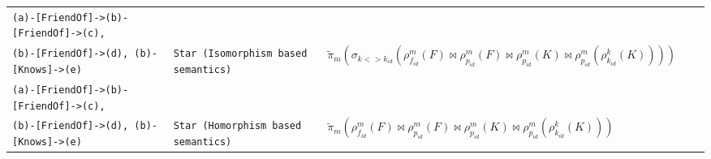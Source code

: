 \documentclass{beamer}
\newcommand{\filt}[2][\mathfrak f]{{\sigma_{#1}\left(#2\right)}}
\newcommand{\rename}[3]{\rho_{#1}^{#2}\left(#3\right)}
\newcommand{\drop}[2]{\widetilde{\pi}_{#1}\left(#2\right)}
\newcommand{\NJoin}{\bowtie}
\newcommand*\trans[1]{\llparenthesis{#1}\rrparenthesis}
\begin{document}
\begin{frame}
\begin{table}[h]
{\begin{tabular}{lllll}
       \texttt{(a)-[FriendOf]->(b)-[FriendOf]->(c),} \\ \texttt{(b)-[FriendOf]->(d), (b)-[Knows]->(e)}  & \texttt{Star (Isomorphism based semantics)} & $ \drop{m}{\filt[k <> k_{id}]{\rename{f_{id}}{m}{F} \NJoin \rename{p_{id}}{m}{F} \NJoin \rename{p_{id}}{m}{K} \NJoin \rename{p_{id}}{m}{\rename{k_{id}}{k}{K}}}} $ && \\ \cline{1-3}
       \texttt{(a)-[FriendOf]->(b)-[FriendOf]->(c),} \\ \texttt{(b)-[FriendOf]->(d), (b)-[Knows]->(e)}  & \texttt{Star (Homorphism based semantics)} & $ \drop{m}{\rename{f_{id}}{m}{F} \NJoin \rename{p_{id}}{m}{F} \NJoin \rename{p_{id}}{m}{K} \NJoin \rename{p_{id}}{m}{\rename{k_{id}}{k}{K}}} $ && \\ \cline{1-3}
       
      \end{tabular}%
      }
      \end{table}
    
\end{frame}
\end{document}
